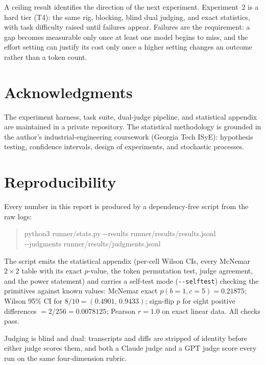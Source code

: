 \documentclass[11pt]{article}
\begin{document}
A ceiling result identifies the direction of the next experiment.
Experiment~2 is a hard tier (T4): the same rig, blocking, blind dual
judging, and exact statistics, with task difficulty raised until failures
appear. Failures are the requirement: a gap becomes measurable only once at
least one model begins to miss, and the effort setting can justify its cost
only once a higher setting changes an outcome rather than a token count.

\section*{Acknowledgments}
The experiment harness, task suite, dual-judge pipeline, and statistical
appendix are maintained in a private repository. The statistical
methodology is grounded in the author's industrial-engineering coursework
(Georgia Tech ISyE): hypothesis testing, confidence intervals, design of
experiments, and stochastic processes.

\appendix
\section{Reproducibility}
\label{app:repro}

Every number in this report is produced by a dependency-free script from
the raw logs:

\begin{quote}
\ttfamily
python3 runner/stats.py -{}-results runner/results/results.jsonl \\
\hspace*{2em} -{}-judgments runner/results/judgments.jsonl
\end{quote}

The script emits the statistical appendix (per-cell Wilson CIs, every
McNemar $2\times2$ table with its exact $p$-value, the token permutation
test, judge agreement, and the power statement) and carries a self-test
mode (\texttt{-{}-selftest}) checking the primitives against known values:
McNemar exact $p(b{=}1, c{=}5) = 0.21875$; Wilson 95\% CI for $8/10 =
(0.4901,\,0.9433)$; sign-flip $p$ for eight positive differences $= 2/256 =
0.0078125$; Pearson $r = 1.0$ on exact linear data. All checks pass.

Judging is blind and dual: transcripts and diffs are stripped of identity
before either judge scores them, and both a Claude judge and a GPT judge
score every run on the same four-dimension rubric.
\end{document}
